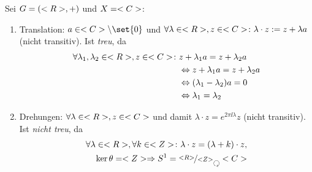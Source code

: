 \begin{*example}
	Sei $G=(<R>,+)$ und $X = <C>$:
	\begin{enumerate} %
		\item Translation: $a \in \C\setminus \set{0}$ und $\forall \lambda \in <R>, z \in <C>\colon \lambda \cdot z := z + \lambda a$ (nicht transitiv). Ist \emph{treu}, da
		\begin{align*}
			\forall \lambda_1, \lambda_2 \in <R>, z \in <C>\colon &z + \lambda_1 a = z + \lambda_2 a\\
			&\Leftrightarrow z + \lambda_1 a = z + \lambda_2 a\\
			&\Leftrightarrow (\lambda_1-\lambda_2)a = 0\\
			&\Leftrightarrow \lambda_1 = \lambda_2
		\end{align*}
		\item Drehungen: $\forall \lambda \in <R>, z \in <C>$ und damit $\lambda \cdot z = e^{2\pi\ii \lambda}z$ (nicht transitiv). Ist \emph{nicht treu}, da 
		\begin{align*}
			\forall \lambda \in \R, \forall k \in \Z\colon \lambda \cdot z = (\lambda + k) \cdot z,\\
			\ker\theta = \Z \implies S^1 = \lnkset{\R}{\Z} \Circlearrowleft \C
		\end{align*}
	\end{enumerate}
\end{*example}
